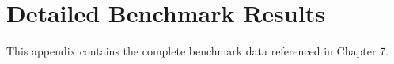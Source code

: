 \chapter{Detailed Benchmark Results}
This appendix contains the complete benchmark data referenced in Chapter 7.
